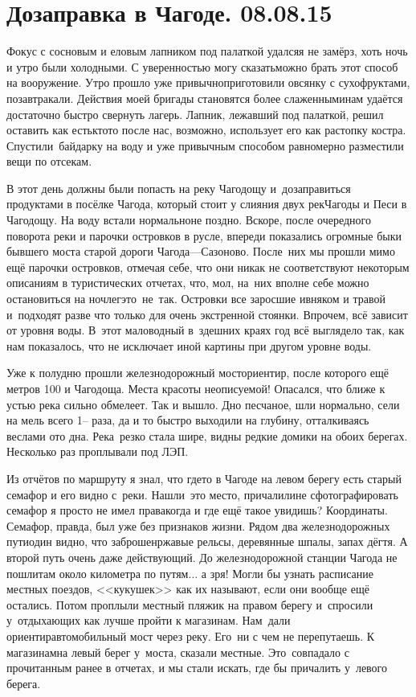 \chapter{Дозаправка в Чагоде. 08.08.15}

Фокус с сосновым и еловым лапником под палаткой удался\mdash я не замёрз, хоть ночь и утро были холодными. С уверенностью могу сказать\mdash можно брать этот способ на вооружение. Утро прошло уже привычно\mdash приготовили овсянку с сухофруктами, позавтракали. Действия моей бригады становятся более слаженными\mdash нам удаётся достаточно быстро свернуть лагерь. Лапник, лежавший под палаткой, решил оставить как есть\mdash кто\sdash то после нас, возможно, использует его как растопку костра. Спустили~байдарку на воду и уже привычным  способом равномерно разместили вещи по отсекам. 

В этот день должны были попасть на реку Чагодощу и~дозаправиться продуктами в посёлке Чагода, который стоит у слияния двух рек\mdash Чагоды и Песи в Чагодощу. На воду встали нормально\mdash не поздно. Вскоре, после очередного поворота реки и парочки островков в русле, впереди показались огромные быки бывшего моста старой дороги Чагода\thinspace\nobreakdash---\thinspace Сазоново. После~них мы прошли мимо ещё парочки островков, отмечая себе, что они никак не соответствуют некоторым описаниям в туристических отчетах, что, мол, на~них вполне себе можно остановиться на ночлег\mdash это~не~так. Островки все заросшие ивняком и травой и~подходят разве что только для очень экстренной стоянки. Впрочем, всё зависит от уровня воды. В~этот маловодный в~здешних краях год всё выглядело так, как нам показалось, что не исключает иной картины при другом уровне воды. 

Уже к полудню прошли железнодорожный мост\mdash ориентир, после которого ещё метров 100 и Чагодоща. Места красоты неописуемой! Опасался, что ближе к устью река сильно обмелеет. Так и вышло. Дно песчаное, шли нормально, сели на мель всего 1\thinspace\nobreakdash-- раза, да и то быстро выходили на глубину, отталкиваясь веслами ото дна. Река~резко стала шире, видны редкие домики на обоих берегах. Несколько раз проплывали под ЛЭП. 

Из отчётов по маршруту я знал, что где\sdash то в Чагоде на левом берегу есть старый семафор и его видно с~реки. Нашли~это место, причалили\mdash не сфотографировать семафор я просто не имел права\mdash когда и где ещё такое увидишь? Координаты\mdash \CoordsChagodoschaSemaphor. Семафор, правда, был уже без признаков жизни. Рядом два железнодорожных пути\mdash один видно, что заброшен\mdash ржавые рельсы, деревянные шпалы, запах дёгтя. А второй путь очень даже действующий. До железнодорожной станции Чагода не пошли\mdash там около километра по путям$\ldots$ а зря! Могли бы узнать расписание местных поездов, <<кукушек>> как их называют, если они вообще ещё остались. 
\newpage
Потом проплыли местный пляжик на правом берегу и~спросили у~отдыхающих как лучше пройти к магазинам. Нам~дали ориентир\mdash автомобильный мост через реку. Его~ни с чем не перепутаешь. К магазинам\mdash на левый берег у~моста, сказали местные. Это~совпадало с прочитанным ранее в отчетах, и мы стали искать, где бы причалить у~левого берега. 

